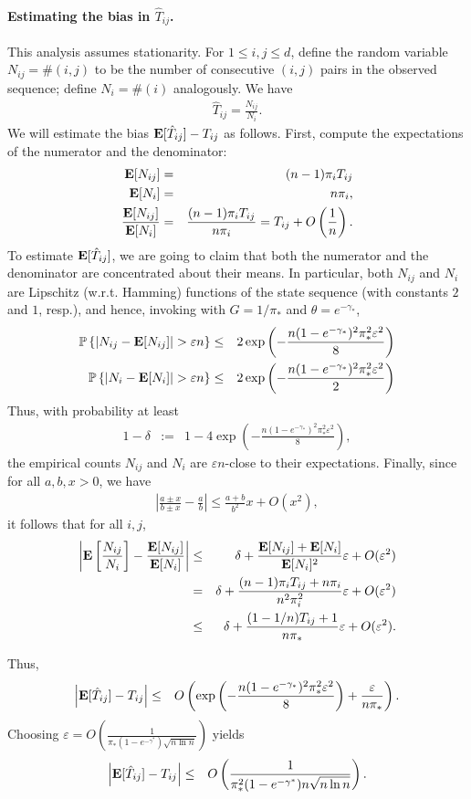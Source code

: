 \documentclass[11pt]{article}
\renewcommand{\P}[1]{\mathbb{P}\left\{#1\right\}}
\newcommand{\eps}{\varepsilon}
\theoremstyle{plain}
\theoremstyle{definition}
\theoremstyle{remark}
\DeclareMathOperator*{\E}{\text{\bf E}}
\newcommand{\paren}[1]{\left( #1 \right)}
\newcommand{\sqprn}[1]{\left[ #1 \right]}
\newcommand{\oo}[1]{\frac{1}{#1}}
\newcommand{\abs}[1]{\left| #1 \right|}
\newcommand{\beq}{\begin{eqnarray*}}
\newcommand{\eeq}{\end{eqnarray*}}
\begin{document}
\paragraph{Estimating the bias in $\hat T_{ij}$.}
This analysis assumes stationarity. 
For $1\le i,j\le d$, define the random variable $N_{ij}=\#(i,j)$ to be the number of consecutive $(i,j)$
pairs in the observed sequence; define $N_i=\#(i)$ analogously.
We have
\beq
\hat T_{ij} = \frac{ N_{ij}}{N_i}.
\eeq
We will estimate the bias $\E[\hat T_{ij}]-T_{ij}$ as follows.
First, compute the expectations of the numerator and the denominator:
\beq
\E[N_{ij}]
&=& 
(n-1)\pi_i T_{ij} 
\\
\E[N_{i}]
&=& n\pi_i
,\\
\frac{\E[N_{ij}]}{\E[N_{i}]}
&=&
\frac{(n-1)\pi_i T_{ij}}{n\pi_i} = T_{ij}+O\paren{\oo n}.
\eeq
To estimate $\E[\hat T_{ij}]$, we are going to claim that both the numerator and the denominator
are concentrated about their means.
In particular, both $N_{ij}$ and $N_i$ are Lipschitz (w.r.t. Hamming) functions of the state sequence
(with constants $2$ and $1$, resp.),
and hence, invoking \citet[Theorem 1.1]{meroi2012-jap} with $G=1/\pi_*$ and $\theta=e^{-\gamma_*}$,
\beq
\P{ \abs { 
N_{ij}-\E[N_{ij}]
} > \eps n
} &\le& 2\exp\paren{ -\frac{n(1-e^{-\gamma_*})^2\pi_*^2\eps^2}{8} } \\
\P{ \abs { 
N_{i}-\E[N_{i}]
} > 
\eps n} &\le& 2\exp\paren{ -\frac{n(1-e^{-\gamma_*})^2\pi_*^2\eps^2}{2} } \\
\eeq
Thus, with probability at least
\beq
1-\delta &:=& 1-4 \exp\paren{ -\frac{n(1-e^{-\gamma_*})^2\pi_*^2\eps^2}{8} },
\eeq
the empirical counts $N_{ij}$ and $N_i$ are $\eps n$-close to their expectations.
Finally, since for all $a,b,x>0$, we have
\beq
\abs{ \frac{a\pm x}{b\pm x} - \frac a b} \le \frac{a+b}{b^2}x+O(x^2), 
\eeq
it follows that for all $i,j$,
\beq
\abs{
\E\sqprn{\frac{ N_{ij}}{N_i}}
-
\frac{\E[N_{ij}]}{\E[N_{i}]}
}
&\le&
\delta + \frac{\E[N_{ij}]+\E[N_i]}{\E[N_i]^2}\eps + O(\eps^2) \\
&=& \delta + \frac{ (n-1)\pi_i T_{ij} + n\pi_i}{n^2\pi_i^2}\eps + O(\eps^2) \\
&\le& \delta + \frac{ (1-1/n)T_{ij} + 1}{n\pi_*}\eps + O(\eps^2).
\eeq

Thus,
\beq
\abs{\E[\hat T_{ij}]-T_{ij}} &\le&
O\paren{
\exp\paren{ -\frac{n(1-e^{-\gamma_*})^2\pi_*^2\eps^2}{8} }
+\frac{\eps}{n\pi_*}}.
\eeq
Choosing $\eps=O\paren{\frac{1}{\pi_*(1-e^{-\gamma^*})\sqrt{n\ln n}}}$ yields
\beq
\abs{\E[\hat T_{ij}]-T_{ij}} &\le&
O\paren{
\frac{1}{\pi_*^2(1-e^{-\gamma^*})n\sqrt{n\ln n}}}.
\eeq
\end{document}
